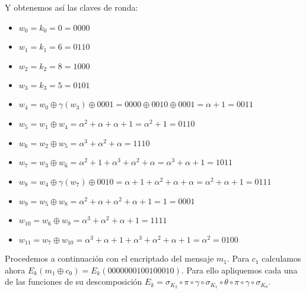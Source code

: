 \documentclass[fleqn]{article}
\begin{document}
    Y obtenemos así las claves de ronda:
    \begin{itemize}
        \item $w_0 = k_0 = 0 = 0000$
        \item $w_1 = k_1 = 6 = 0110$
        \item $w_2 = k_2 = 8 = 1000$
        \item $w_3 = k_3 = 5 = 0101$
        \item $w_4 = w_0 \oplus \gamma(w_3) \oplus 0001 = 0000 \oplus 0010 \oplus 0001 = \alpha + 1 = 0011$
        \item $w_5 = w_1 \oplus w_4 = \alpha^2 + \alpha + \alpha + 1 = \alpha^2 + 1 = 0110$
        \item $w_6 = w_2 \oplus w_5 = \alpha^3 + \alpha^2 + \alpha = 1110$
        \item $w_7 = w_3 \oplus w_6 = \alpha^2 + 1 + \alpha^3 + \alpha^2 + \alpha = \alpha^3 + \alpha + 1 = 1011$
        \item $w_8 = w_4 \oplus \gamma(w_7) \oplus 0010 = \alpha + 1 + \alpha^2 + \alpha + \alpha = \alpha^2 + \alpha + 1 = 0111$
        \item $w_9 = w_5 \oplus w_8 = \alpha^2 + \alpha + \alpha^2 + \alpha + 1 = 1 = 0001$
        \item $w_{10} = w_6 \oplus w_9 = \alpha^3 + \alpha^2 + \alpha + 1 = 1111$
        \item $w_{11} = w_7 \oplus w_{10} = \alpha^3 + \alpha + 1 + \alpha^3 + \alpha^2 + \alpha + 1 = \alpha^2 = 0100$
    \end{itemize}

    Procedemos a continuación con el encriptado del mensaje $m_1$.
    Para $c_1$ calculamos ahora $E_k(m_1 \oplus c_0) = E_k(0000000100100010)$. Para ello apliquemos cada una de las funciones de 
    su descomposición $E_k = \sigma_{K_2} \circ \pi \circ \gamma \circ \sigma_{K_1} \circ \theta \circ \pi \circ \gamma \circ\sigma_{K_0}$.
\end{document}
